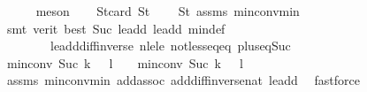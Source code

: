\begin{isabellebody}
\ \ \ \ \isamarkupfalse%
\ meson\isanewline
\ \ \isamarkupfalse%
\ S{}t{}{\isacharcolon}{\kern0pt}{\isachardoublequoteopen}card\ S{}t\ {\isasymge}\ {}{\isachardoublequoteclose}\ \isamarkupfalse%
\ S{}t{\isacharparenleft}{\kern0pt}{}{\isacharparenright}{\kern0pt}\ assms{\isacharparenleft}{\kern0pt}{}{\isacharparenright}{\kern0pt}\ min{\isacharunderscore}{\kern0pt}conv{\isacharunderscore}{\kern0pt}min\isanewline
\ \ \ \ \isamarkupfalse%
\ {\isacharparenleft}{\kern0pt}smt\ {\isacharparenleft}{\kern0pt}verit{\isacharcomma}{\kern0pt}\ best{\isacharparenright}{\kern0pt}\ Suc{\isacharunderscore}{\kern0pt}{}\ le{\isacharunderscore}{\kern0pt}add{}\ le{\isacharunderscore}{\kern0pt}add{}\ min{\isacharunderscore}{\kern0pt}def\isanewline
\ \ \ \ \ \ \ \ le{\isacharunderscore}{\kern0pt}add{\isacharunderscore}{\kern0pt}diff{\isacharunderscore}{\kern0pt}inverse\ nle{\isacharunderscore}{\kern0pt}le\ not{\isacharunderscore}{\kern0pt}less{\isacharunderscore}{\kern0pt}eq{\isacharunderscore}{\kern0pt}eq\ plus{\isacharunderscore}{\kern0pt}{}{\isacharunderscore}{\kern0pt}eq{\isacharunderscore}{\kern0pt}Suc{\isacharparenright}{\kern0pt}\isanewline
\isanewline
\ \ \isamarkupfalse%
\ {\isachardoublequoteopen}min{\isacharunderscore}{\kern0pt}conv\ {\isacharparenleft}{\kern0pt}Suc\ {\isacharparenleft}{\kern0pt}k\ {\isacharplus}{\kern0pt}\ {}{\isacharparenright}{\kern0pt}{\isacharparenright}{\kern0pt}\ {\isacharparenleft}{\kern0pt}l\ {\isacharplus}{\kern0pt}\ {}{\isacharparenright}{\kern0pt}\ {\isachargreater}{\kern0pt}\ min{\isacharunderscore}{\kern0pt}conv\ {\isacharparenleft}{\kern0pt}Suc\ {\isacharparenleft}{\kern0pt}k\ {\isacharplus}{\kern0pt}\ {}{\isacharparenright}{\kern0pt}{\isacharparenright}{\kern0pt}\ {\isacharparenleft}{\kern0pt}l\ {\isacharplus}{\kern0pt}\ {}{\isacharparenright}{\kern0pt}\ {\isacharminus}{\kern0pt}\ {}{\isachardoublequoteclose}\isanewline
\ \ \ \ \isamarkupfalse%
\ assms{\isacharparenleft}{\kern0pt}{}{\isacharparenright}{\kern0pt}\ min{\isacharunderscore}{\kern0pt}conv{\isacharunderscore}{\kern0pt}min\ add{\isachardot}{\kern0pt}assoc\ add{\isacharunderscore}{\kern0pt}diff{\isacharunderscore}{\kern0pt}inverse{\isacharunderscore}{\kern0pt}nat\ le{\isacharunderscore}{\kern0pt}add{}\ \isamarkupfalse%
\ fastforce\isanewline

\end{isabellebody}

